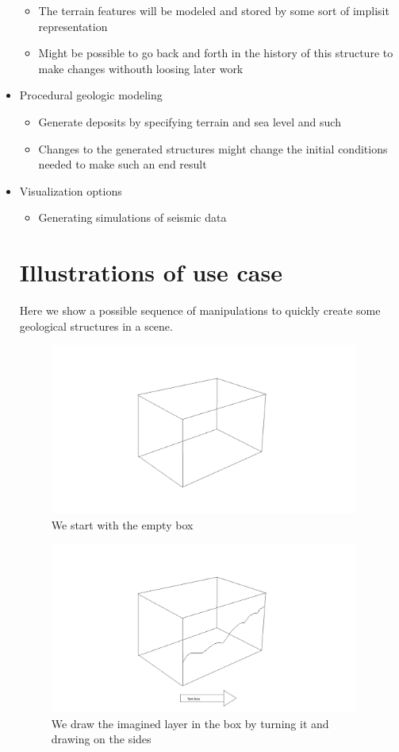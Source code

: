 \documentclass[12pt,a4paper]{article}
\begin{document}
\begin{itemize}
    \begin{itemize}
     \item The terrain features will be modeled and stored by some sort of implisit representation
     \item Might be possible to go back and forth in the history of this structure to make changes withouth loosing later work
    \end{itemize}
\item Procedural geologic modeling
    \begin{itemize}
     \item Generate deposits by specifying terrain and sea level and such
     \item Changes to the generated structures might change the initial conditions needed to make such an end result
    \end{itemize}
\item Visualization options
    \begin{itemize}
     \item Generating simulations of seismic data
\end{itemize}


\section*{Illustrations of use case}
Here we show a possible sequence of manipulations to  quickly create some geological structures in a scene.
\begin{figure}
\centering
\includegraphics[width=4in]{box}
\caption[]{
  \footnotesize
  We start with the empty box
  \label{fig:box}
}
\end{figure}

\begin{figure}
\centering
\includegraphics[width=4in]{turnBox}
\caption[]{
  \footnotesize
  We draw the imagined layer in the box by turning it and drawing on the sides
  \label{fig:turnBox}
}
\end{figure}


\end{itemize}
\end{document}
